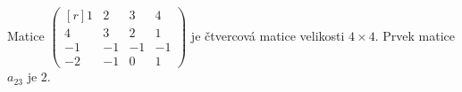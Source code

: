\begin{mdframed}[style=mdexam]
  \begin{example}\label{MAI:exam033}
    Matice \(\begin{pmatrix*}[r]1&2&3&4\\4&3&2&1\\-1&-1&-1&-1\\-2&-1&0&1\end{pmatrix*}\) je čtvercová 
    matice velikosti \(4\times4\). Prvek matice \(a_{23}\) je \(2\).
  \end{example}
\end{mdframed}